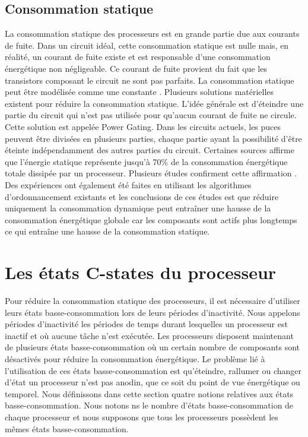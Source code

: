 \subsection{Consommation statique}
\vspace{-1cm}
La consommation statique des processeurs est en grande partie due aux courants de fuite. 
Dans un circuit idéal, cette consommation statique est nulle mais, en réalité, un courant 
de fuite existe et est responsable d’une consommation énergétique non négligeable. 
Ce courant de fuite provient du fait que les transistors composant le circuit ne sont pas parfaits. 
La consommation statique peut être modélisée comme une constante \cite{KAB+03, SJPL08}.
Plusieurs solutions matérielles existent pour réduire la consommation statique. 
L’idée générale est d’éteindre une partie du circuit qui n’est pas utilisée pour qu’aucun courant de fuite ne circule. 
Cette solution est appelée Power Gating. Dans les circuits actuels, les puces peuvent être divisées en plusieurs parties, 
chaque partie ayant la possibilité d’être éteinte indépendamment des autres parties du circuit. Certaines sources \cite{HXW+10} 
affirme que l’énergie statique représente jusqu’à 70\% de la consommation énergétique totale dissipée par un processeur. 
Plusieurs études confirment cette affirmation \cite{Bor99, SBA+01, KAB+03, ABM+04, HSC+11, BBMB13}. Des expériences ont également été faites 
\cite{SRH05, SPH05, LSH10} en utilisant les algorithmes d’ordonnancement existants et les conclusions de ces études est que réduire uniquement 
la consommation dynamique peut entraîner une hausse de la consommation énergétique globale car les composants sont actifs plus longtemps ce 
qui entraîne une hausse de la consommation statique.

\section{Les états C-states du processeur}
\vspace{-1cm}
\label{sec:cstate}
Pour réduire la consommation statique des processeurs, 
il est nécessaire d’utiliser leurs états basse-consommation lors de leurs périodes d’inactivité. 
Nous appelons périodes d’inactivité les périodes de temps durant lesquelles un processeur est inactif et où aucune tâche n’est exécutée. 
Les processeurs disposent maintenant de plusieurs états basse-consommation où un certain nombre de composants sont désactivés pour réduire la consommation énergétique. 
Le problème lié à l’utilisation de ces états basse-consommation est qu’éteindre, rallumer ou changer d’état un processeur n’est pas anodin, que ce soit du point de vue 
énergétique ou temporel. Nous définissons dans cette section quatre notions relatives aux états basse-consommation. Nous notons ns le nombre d’états basse-consommation 
de chaque processeur et nous supposons que tous les processeurs possèdent les mêmes états basse-consommation.

